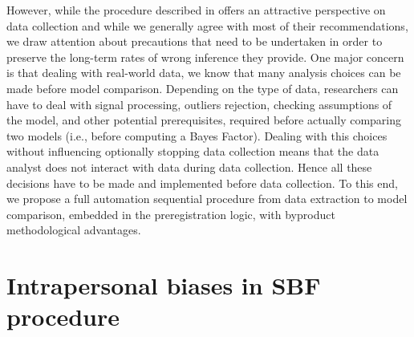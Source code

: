 \documentclass[a4paper,man,natbib,floatsintext,donotrepeattitle]{apa6}
\begin{document}
However, while the procedure described in \cite{schonbrodt_sequential_2017} offers an attractive perspective on data collection and while we generally agree with most of their recommendations, we draw attention about precautions that need to be undertaken in order to preserve the long-term rates of wrong inference they provide. One major concern is that dealing with real-world data, we know that many analysis choices can be made before model comparison. Depending on the type of data, researchers can have to deal with signal processing, outliers rejection, checking assumptions of the model, and other potential prerequisites, required before actually comparing two models (i.e., before computing a Bayes Factor). Dealing with this choices without influencing optionally stopping data collection means that the data analyst does not interact with data during data collection. Hence all these decisions have to be made and implemented before data collection. To this end, we propose a full automation sequential procedure from data extraction to model comparison, embedded in the preregistration logic, with byproduct methodological advantages.


\section{Intrapersonal biases in SBF procedure}
\end{document}
